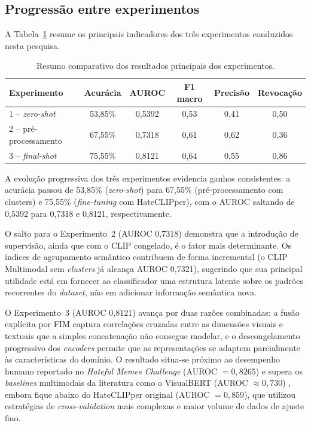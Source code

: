 \subsection{Progressão entre experimentos}

A Tabela~\ref{tab:resultados-resumo} resume os principais indicadores dos três experimentos conduzidos nesta pesquisa.

\begin{table}[htbp]
    \centering
    \caption{Resumo comparativo dos resultados principais dos experimentos.}
    \label{tab:resultados-resumo}
    \begin{tabular}{lccccc}
        \hline
        \textbf{Experimento} & \textbf{Acurácia} & \textbf{AUROC} & \textbf{F1 macro} & \textbf{Precisão} & \textbf{Revocação} \\
        \hline
        1 -- \textit{zero-shot} & 53,85\% & 0,5392 & 0,53 & 0,41 & 0,50 \\
        2 -- pré-processamento & 67,55\% & 0,7318 & 0,61 & 0,62 & 0,36 \\
        3 -- \textit{final-shot} & 75,55\% & 0,8121 & 0,64 & 0,55 & 0,86 \\
        \hline
    \end{tabular}
\end{table}

A evolução progressiva dos três experimentos evidencia ganhos consistentes: a acurácia passou de 53,85\% (\textit{zero-shot}) para 67,55\% (pré-processamento com clusters) e 75,55\% (\textit{fine-tuning} com HateCLIPper), com o AUROC saltando de 0,5392 para 0,7318 e 0,8121, respectivamente.

O salto para o Experimento~2 (AUROC 0,7318) demonstra que a introdução de supervisão, ainda que com o CLIP congelado, é o fator mais determinante. Os índices de agrupamento semântico contribuem de forma incremental (o CLIP Multimodal sem \textit{clusters} já alcança AUROC 0,7321), sugerindo que sua principal utilidade está em fornecer ao classificador uma estrutura latente sobre os padrões recorrentes do \textit{dataset}, não em adicionar informação semântica nova.

O Experimento~3 (AUROC 0,8121) avança por duas razões combinadas: a fusão explícita por FIM captura correlações cruzadas entre as dimensões visuais e textuais que a simples concatenação não consegue modelar, e o descongelamento progressivo dos \textit{encoders} permite que as representações se adaptem parcialmente às características do domínio. O resultado situa-se próximo ao desempenho humano reportado no \textit{Hateful Memes Challenge} (AUROC $= 0{,}8265$) e supera os \textit{baselines} multimodais da literatura como o VisualBERT (AUROC $\approx 0{,}730$) \cite{ArticleHatefulMemesChallenge2020}, embora fique abaixo do HateCLIPper original \cite{kumar2022} (AUROC $= 0{,}859$), que utilizou estratégias de \textit{cross-validation} mais complexas e maior volume de dados de ajuste fino.

